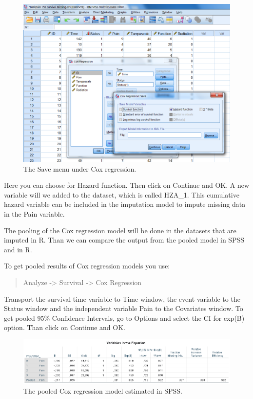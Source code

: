 \documentclass[]{book}
\theoremstyle{definition}
\theoremstyle{definition}
\theoremstyle{definition}
\theoremstyle{remark}
\begin{document}
\begin{figure}

{\centering \includegraphics[width=0.9\linewidth]{images/fig5.6} 

}

\caption{The Save menu under Cox regression.}\label{fig:fig5-6}
\end{figure}

Here you can choose for Hazard function. Then click on Continue and OK.
A new variable will we added to the dataset, which is called HZA\_1.
This cumulative hazard variable can be included in the imputation model
to impute missing data in the Pain variable.

The pooling of the Cox regression model will be done in the datasets
that are imputed in R. Than we can compare the output from the pooled
model in SPSS and in R.

To get pooled results of Cox regression models you use:

\begin{quote}
Analyze -\textgreater{} Survival -\textgreater{} Cox Regression
\end{quote}

Transport the survival time variable to Time window, the event variable
to the Status window and the independent variable Pain to the Covariates
window. To get pooled 95\% Confidence Intervals, go to Options and
select the CI for exp(B) option. Than click on Continue and OK.

\begin{figure}

{\centering \includegraphics[width=0.9\linewidth]{images/table5.10} 

}

\caption{The pooled Cox regression model estimated in SPSS.}\label{fig:tab5-10}
\end{figure}
\end{document}
